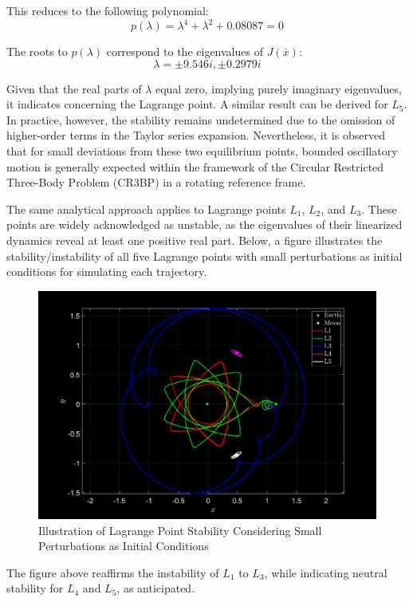 This reduces to the following polynomial:
\begin{equation}
    p(\lambda) = \lambda^4 + \lambda^2 + 0.08087 = 0
\end{equation}

The roots to $p(\lambda)$ correspond to the eigenvalues of $J(\bar{x})$:
\begin{equation*}
    \lambda = \pm 9.546i, \pm 0.2979i
\end{equation*}

Given that the real parts of $\lambda$ equal zero, implying purely imaginary eigenvalues, it indicates  concerning the Lagrange point. A similar result can be derived for $L_5$. In practice, however, the stability remains undetermined due to the omission of higher-order terms in the Taylor series expansion. Nevertheless, it is observed that for small deviations from these two equilibrium points, bounded oscillatory motion is generally expected within the framework of the Circular Restricted Three-Body Problem (CR3BP) in a rotating reference frame.

\pagebreak

The same analytical approach applies to Lagrange points $L_1$, $L_2$, and $L_3$. These points are widely acknowledged as unstable, as the eigenvalues of their linearized dynamics reveal at least one positive real part. Below, a figure illustrates the stability/instability of all five Lagrange points with small perturbations as initial conditions for simulating each trajectory.

\begin{figure}[h]
    \centering
    \includegraphics[width=\textwidth]{fig/lagrangeStability.png}
    \caption{Illustration of Lagrange Point Stability Considering Small Perturbations as Initial Conditions}
    \label{fig:stability}
\end{figure}

The figure above reaffirms the instability of $L_1$ to $L_3$, while indicating neutral stability for $L_4$ and $L_5$, as anticipated.